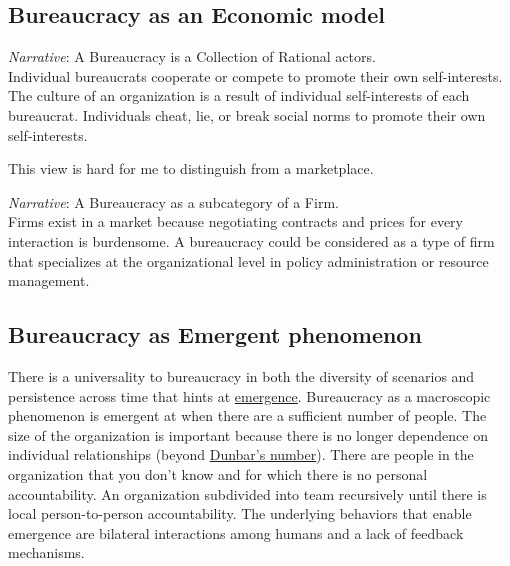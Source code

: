 
\subsection{Bureaucracy as an Economic model}

\textit{Narrative}: A Bureaucracy is a Collection of Rational actors. \\
Individual bureaucrats cooperate or compete to promote their own self-interests.
The culture of an organization is a result of individual self-interests of each bureaucrat.
Individuals cheat, lie, or break social norms to promote their own self-interests.

This view is hard for me to distinguish from a marketplace. 


\textit{Narrative}: A Bureaucracy as a subcategory of a Firm. \\
Firms exist in a market because negotiating contracts and prices for every interaction is burdensome. 
A bureaucracy could be considered as a type of firm that specializes at the organizational level in policy administration or resource management. 



\subsection{Bureaucracy as Emergent phenomenon}

There is a universality to bureaucracy in both the diversity of scenarios and persistence across time that hints at \href{https://en.wikipedia.org/wiki/Emergence}{emergence}. Bureaucracy as a macroscopic phenomenon is emergent at when there are a sufficient number of people. The size of the organization is important because there is no longer dependence on individual relationships (beyond \href{https://en.wikipedia.org/wiki/Dunbar\%27s_number}{Dunbar's number}). There are people in the organization that you don't know and for which there is no personal accountability. An organization subdivided into team recursively until there is local person-to-person accountability.  The underlying behaviors that enable emergence are bilateral interactions among humans and a lack of feedback mechanisms. 

